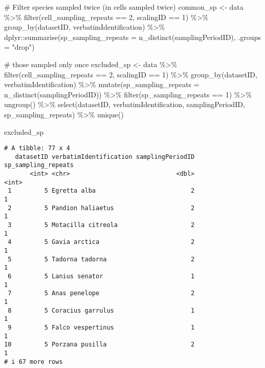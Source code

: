 \documentclass[
  letterpaper,
  DIV=11,
  numbers=noendperiod]{scrreprt}
\newenvironment{Shaded}{\begin{snugshade}}{\end{snugshade}}
\newcommand{\AttributeTok}[1]{\textcolor[rgb]{0.40,0.45,0.13}{#1}}
\newcommand{\CommentTok}[1]{\textcolor[rgb]{0.37,0.37,0.37}{#1}}
\newcommand{\DecValTok}[1]{\textcolor[rgb]{0.68,0.00,0.00}{#1}}
\newcommand{\FunctionTok}[1]{\textcolor[rgb]{0.28,0.35,0.67}{#1}}
\newcommand{\NormalTok}[1]{\textcolor[rgb]{0.00,0.23,0.31}{#1}}
\newcommand{\OtherTok}[1]{\textcolor[rgb]{0.00,0.23,0.31}{#1}}
\newcommand{\SpecialCharTok}[1]{\textcolor[rgb]{0.37,0.37,0.37}{#1}}
\newcommand{\StringTok}[1]{\textcolor[rgb]{0.13,0.47,0.30}{#1}}
\begin{document}
\begin{Shaded}
\begin{Highlighting}[]
\CommentTok{\# Filter species sampled twice (in cells sampled twice)}
\NormalTok{common\_sp }\OtherTok{\textless{}{-}}\NormalTok{ data }\SpecialCharTok{\%\textgreater{}\%}
  \FunctionTok{filter}\NormalTok{(cell\_sampling\_repeats }\SpecialCharTok{==} \DecValTok{2}\NormalTok{, scalingID }\SpecialCharTok{==} \DecValTok{1}\NormalTok{) }\SpecialCharTok{\%\textgreater{}\%}
  \FunctionTok{group\_by}\NormalTok{(datasetID, verbatimIdentification) }\SpecialCharTok{\%\textgreater{}\%}
\NormalTok{  dplyr}\SpecialCharTok{::}\FunctionTok{summarise}\NormalTok{(}\AttributeTok{sp\_sampling\_repeats =} \FunctionTok{n\_distinct}\NormalTok{(samplingPeriodID), }\AttributeTok{.groups =} \StringTok{"drop"}\NormalTok{)}

\CommentTok{\# those sampled only once}
\NormalTok{excluded\_sp }\OtherTok{\textless{}{-}}\NormalTok{ data }\SpecialCharTok{\%\textgreater{}\%}
  \FunctionTok{filter}\NormalTok{(cell\_sampling\_repeats }\SpecialCharTok{==} \DecValTok{2}\NormalTok{, scalingID }\SpecialCharTok{==} \DecValTok{1}\NormalTok{) }\SpecialCharTok{\%\textgreater{}\%}
  \FunctionTok{group\_by}\NormalTok{(datasetID, verbatimIdentification) }\SpecialCharTok{\%\textgreater{}\%}
  \FunctionTok{mutate}\NormalTok{(}\AttributeTok{sp\_sampling\_repeats =} \FunctionTok{n\_distinct}\NormalTok{(samplingPeriodID)) }\SpecialCharTok{\%\textgreater{}\%}
  \FunctionTok{filter}\NormalTok{(sp\_sampling\_repeats }\SpecialCharTok{==} \DecValTok{1}\NormalTok{) }\SpecialCharTok{\%\textgreater{}\%}
  \FunctionTok{ungroup}\NormalTok{() }\SpecialCharTok{\%\textgreater{}\%}
  \FunctionTok{select}\NormalTok{(datasetID, verbatimIdentification, samplingPeriodID, sp\_sampling\_repeats) }\SpecialCharTok{\%\textgreater{}\%}
  \FunctionTok{unique}\NormalTok{()}

\NormalTok{excluded\_sp}
\end{Highlighting}
\end{Shaded}

\begin{verbatim}
# A tibble: 77 x 4
   datasetID verbatimIdentification samplingPeriodID sp_sampling_repeats
       <int> <chr>                             <dbl>               <int>
 1         5 Egretta alba                          2                   1
 2         5 Pandion haliaetus                     2                   1
 3         5 Motacilla citreola                    2                   1
 4         5 Gavia arctica                         2                   1
 5         5 Tadorna tadorna                       2                   1
 6         5 Lanius senator                        1                   1
 7         5 Anas penelope                         2                   1
 8         5 Coracius garrulus                     1                   1
 9         5 Falco vespertinus                     1                   1
10         5 Porzana pusilla                       2                   1
# i 67 more rows
\end{verbatim}
\end{document}
